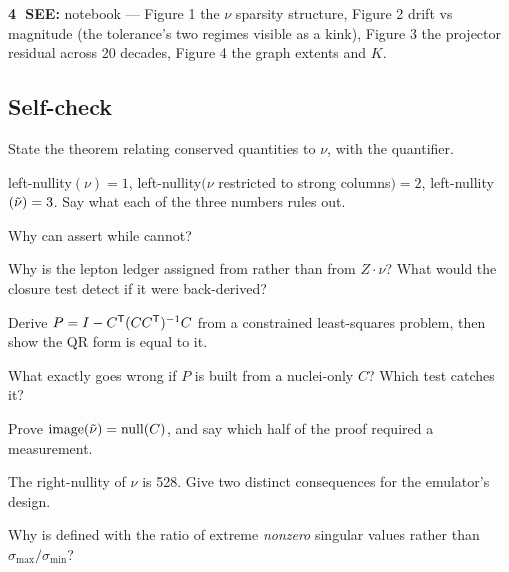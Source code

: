 \begin{repopointer}
\textbf{\textcircled{4} SEE:} notebook  ---
Figure 1 the $\nu$ sparsity structure, Figure 2 drift vs \netflux{} magnitude
(the tolerance's two regimes visible as a kink), Figure 3 the projector residual
across 20 decades, Figure 4 the graph extents and $K$.
\end{repopointer}

\subsection{Self-check}
\label{sec:selfcheck-s7}

\begin{selfcheck}
\item State the theorem relating conserved quantities to $\nu$, with the
  quantifier.
\item left-nullity$(\nu) = 1$, left-nullity$(\nu$ restricted to strong
  columns$) = 2$, left-nullity$(\tilde\nu) = 3$. Say what each of the three numbers
  rules out.
\item Why can  assert
   while  cannot?
\item Why is the lepton ledger assigned from  rather than from
  $Z\cdot\nu$? What would the closure test detect if it were back-derived?
\item Derive $P = I - C^{\mathsf{T}}(CC^{\mathsf{T}})^{-1}C$ from a constrained least-squares
  problem, then show the QR form is equal to it.
\item What exactly goes wrong if $P$ is built from a nuclei-only $C$? Which test
  catches it?
\item Prove $\operatorname{image}(\tilde\nu) = \operatorname{null}(C)$, and say which half of the
  proof required a measurement.
\item The right-nullity of $\nu$ is 528. Give two distinct consequences for the
  emulator's design.
\item Why is  defined with the ratio of extreme
  \emph{nonzero} singular values rather than
  $\sigma_{\max}/\sigma_{\min}$?
\end{selfcheck}
